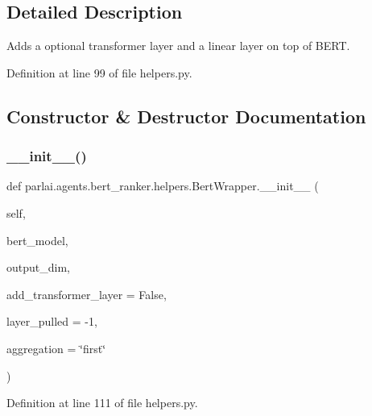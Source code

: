 \subsection{Detailed Description}
\begin{DoxyVerb}Adds a optional transformer layer and a linear layer on top of BERT.
\end{DoxyVerb}
 

Definition at line 99 of file helpers.\+py.



\subsection{Constructor \& Destructor Documentation}
\mbox{\label{classparlai_1_1agents_1_1bert__ranker_1_1helpers_1_1BertWrapper_ad21b2bd2d710a64477265cf882f6c79a}} 
\subsubsection{\texorpdfstring{\+\_\+\+\_\+init\+\_\+\+\_\+()}{\_\_init\_\_()}}
{\footnotesize\ttfamily def parlai.\+agents.\+bert\+\_\+ranker.\+helpers.\+Bert\+Wrapper.\+\_\+\+\_\+init\+\_\+\+\_\+ (\begin{DoxyParamCaption}\item[{}]{self,  }\item[{}]{bert\+\_\+model,  }\item[{}]{output\+\_\+dim,  }\item[{}]{add\+\_\+transformer\+\_\+layer = {\ttfamily False},  }\item[{}]{layer\+\_\+pulled = {\ttfamily -\/1},  }\item[{}]{aggregation = {\ttfamily \char`\"{}first\char`\"{}} }\end{DoxyParamCaption})}



Definition at line 111 of file helpers.\+py.


